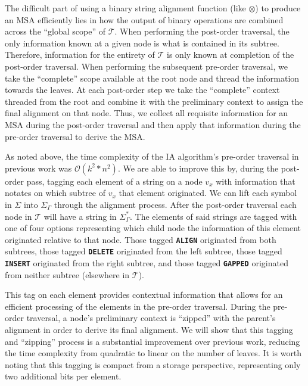 \documentclass{bmcart}
\begin{document}
The difficult part of using a binary string alignment function (like $\otimes$) to produce an MSA efficiently lies in how the output of binary operations are combined across the ``global scope'' of $\mathcal{T}$.
When performing the post-order traversal, the only information known at a given node is what is contained in its subtree.
Therefore, information for the entirety of $\mathcal{T}$ is only known at completion of the post-order traversal.
When performing the subsequent pre-order traversal, we take the ``complete'' scope available at the root node and thread the information towards the leaves.
At each post-order step we take the ``complete'' context threaded from the root and combine it with the preliminary context to assign the final alignment on that node.
Thus, we collect all requisite information for an MSA during the post-order traversal and then apply that information during the pre-order traversal to derive the MSA.

As noted above, the time complexity of the IA algorithm's pre-order traversal in previous work was $\mathcal{O}(k^2 * n^2)$.
We are able to improve this by, during the post-order pass, tagging each element of a string on a node $v_x$ with information that notates on which subtree of $v_x$ that element originated.
We can lift each symbol in $\Sigma$ into $\Sigma_{\Gamma}$ through the alignment process.
After the post-order traversal each node in $\mathcal{T}$ will have a string in $\Sigma_{\Gamma}^{*}$.
The elements of said strings are tagged with one of four options representing which child node the information of this element originated relative to that node.
Those tagged \textbf{\texttt{ALIGN}} originated from both subtrees, those tagged \textbf{\texttt{DELETE}} originated from the left subtree, those tagged \textbf{\texttt{INSERT}} originated from the right subtree, and those tagged \textbf{\texttt{GAPPED}} originated from neither subtree (elsewhere in $\mathcal{T}$).

This tag on each element provides contextual information that allows for an efficient processing of the elements in the pre-order traversal.
During the pre-order traversal, a node's preliminary context is ``zipped'' with the parent's alignment in order to derive its final alignment.
We will show that this tagging and ``zipping'' process is a substantial improvement over previous work, reducing the time complexity from quadratic to linear on the number of leaves.
It is worth noting that this tagging is compact from a storage perspective, representing only two additional bits per element.
\end{document}
